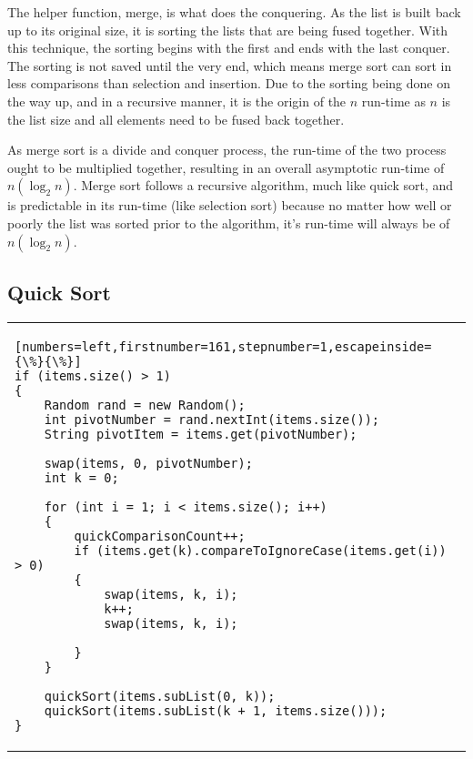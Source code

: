 \documentclass[letterpaper, 10pt,DIV=13]{scrartcl}
\numberwithin{equation}{section} %
\numberwithin{figure}{section} %
\numberwithin{table}{section} %
\begin{document}
The helper function, merge, is what does the conquering. As the list is built back up to its original size, it is sorting the lists that are being fused together.  With this technique, the sorting begins with the first and ends with the last conquer.  The sorting is not saved until the very end, which means merge sort can sort in less comparisons than selection and insertion.  Due to the sorting being done on the way up, and in a recursive manner, it is the origin of the $n$ run-time as $n$ is the list size and all elements need to be fused back together. 

As merge sort is a divide and conquer process, the run-time of the two process ought to be multiplied together, resulting in an overall asymptotic run-time of $n({\log_2 n})$.  Merge sort follows a recursive algorithm, much like quick sort, and is predictable in its run-time (like selection sort) because no matter how well or poorly the list was sorted prior to the algorithm, it's run-time will always be of $n({\log_2 n})$.

\subsection{Quick Sort}

\begin{center}
\begin{tabular}{l}
\begin{lstlisting}[numbers=left,firstnumber=161,stepnumber=1,escapeinside={\%}{\%}]
if (items.size() > 1)
{
    Random rand = new Random();
    int pivotNumber = rand.nextInt(items.size());
    String pivotItem = items.get(pivotNumber);

    swap(items, 0, pivotNumber);
    int k = 0;

    for (int i = 1; i < items.size(); i++)
    {
        quickComparisonCount++;
        if (items.get(k).compareToIgnoreCase(items.get(i)) > 0)
        {
            swap(items, k, i);
            k++;
            swap(items, k, i);

        }
    }

    quickSort(items.subList(0, k));
    quickSort(items.subList(k + 1, items.size()));
}
\end{lstlisting}
\end{tabular}
\end{center}\textbf{}
\end{document}

